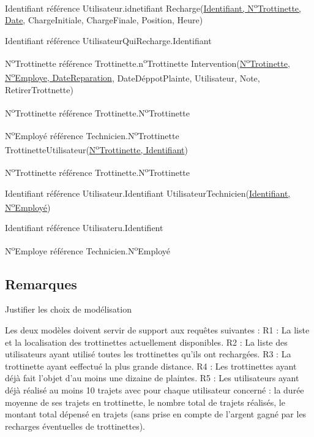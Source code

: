 \documentclass{article}
\newcommand\tab[1][1cm]{\hspace*{#1}}
\begin{document}
\tab Identifiant référence Utilisateur.idnetifiant
\bigbreak
Recharge(\underline{Identifiant, N\textsuperscript{o}Trottinette, Date}, ChargeInitiale, ChargeFinale, Position, Heure)

\tab Identifiant référence UtilisateurQuiRecharge.Identifiant

\tab N\textsuperscript{o}Trottinette référence Trottinette.n\textsuperscript{o}Trottinette
 \bigbreak
 Intervention(\underline{N\textsuperscript{o}Trotinette, N\textsuperscript{o}Employe, DateReparation}, DateDéppotPlainte, Utilisateur, Note, RetirerTrottnette)
 
 \tab N\textsuperscript{o}Trottinette référence Trottinette.N\textsuperscript{o}Trottinette
 
\tab N\textsuperscript{o}Employé référence Technicien.N\textsuperscript{o}Trottinette
\bigbreak
TrottinetteUtilisateur(\underline{N\textsuperscript{o}Trottinette, Identifiant})

\tab N\textsuperscript{o}Trottinette référence Trottinette.N\textsuperscript{o}Trottinette

\tab Identifiant référence Utilisateur.Identifiant
\bigbreak
UtilisateurTechnicien(\underline{Identifiant, N\textsuperscript{o}Employé})

\tab Identifiant référence Utilisateru.Identifient

\tab N\textsuperscript{o}Employe référence Technicien.N\textsuperscript{o}Employé


\subsection*{Remarques}
Justifier les choix de modélisation

Les deux modèles doivent servir de support aux requêtes suivantes :
R1 : La liste et la localisation des trottinettes actuellement disponibles.
R2 : La liste des utilisateurs ayant utilisé toutes les trottinettes qu'ils ont rechargées.
R3 : La trottinette ayant eeffectué la plus grande distance.
R4 : Les trottinettes ayant déjà fait l'objet d'au moins une dizaine de plaintes.
R5 : Les utilisateurs ayant déjà réalisé au moins 10 trajets avec pour chaque utilisateur concerné : la durée moyenne de ses trajets en trottinette, le nombre total de trajets réalisés, le montant total dépensé en trajets (sans prise en compte de l'argent gagné par les recharges éventuelles de trottinettes).
\end{document}
